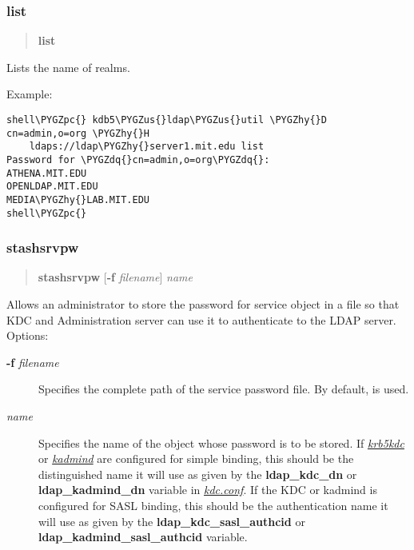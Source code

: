 \documentclass[letterpaper,10pt,english]{sphinxmanual}
\def\PYGZus{\char`\_}
\def\PYGZpc{\char`\%}
\def\PYGZhy{\char`\-}
\def\PYGZdq{\char`\"}
\begin{document}
\subsubsection{list}
\label{admin/admin_commands/kdb5_ldap_util:kdb5-ldap-util-destroy-end}\label{admin/admin_commands/kdb5_ldap_util:list}\label{admin/admin_commands/kdb5_ldap_util:kdb5-ldap-util-list}\begin{quote}

\textbf{list}
\end{quote}

Lists the name of realms.

Example:

\begin{Verbatim}[commandchars=\\\{\}]
shell\PYGZpc{} kdb5\PYGZus{}ldap\PYGZus{}util \PYGZhy{}D cn=admin,o=org \PYGZhy{}H
    ldaps://ldap\PYGZhy{}server1.mit.edu list
Password for \PYGZdq{}cn=admin,o=org\PYGZdq{}:
ATHENA.MIT.EDU
OPENLDAP.MIT.EDU
MEDIA\PYGZhy{}LAB.MIT.EDU
shell\PYGZpc{}
\end{Verbatim}


\subsubsection{stashsrvpw}
\label{admin/admin_commands/kdb5_ldap_util:kdb5-ldap-util-list-end}\label{admin/admin_commands/kdb5_ldap_util:stashsrvpw}\label{admin/admin_commands/kdb5_ldap_util:kdb5-ldap-util-stashsrvpw}\begin{quote}

\textbf{stashsrvpw}
{[}\textbf{-f} \emph{filename}{]}
\emph{name}
\end{quote}

Allows an administrator to store the password for service object in a
file so that KDC and Administration server can use it to authenticate
to the LDAP server.  Options:
\begin{description}
\item[{\textbf{-f} \emph{filename}}] \leavevmode
Specifies the complete path of the service password file. By
default,  is used.

\item[{\emph{name}}] \leavevmode
Specifies the name of the object whose password is to be stored.
If {\hyperref[admin/admin_commands/krb5kdc:krb5kdc-8]{\emph{krb5kdc}}} or {\hyperref[admin/admin_commands/kadmind:kadmind-8]{\emph{kadmind}}} are configured for
simple binding, this should be the distinguished name it will
use as given by the \textbf{ldap\_kdc\_dn} or \textbf{ldap\_kadmind\_dn}
variable in {\hyperref[admin/conf_files/kdc_conf:kdc-conf-5]{\emph{kdc.conf}}}.  If the KDC or kadmind is
configured for SASL binding, this should be the authentication
name it will use as given by the \textbf{ldap\_kdc\_sasl\_authcid} or
\textbf{ldap\_kadmind\_sasl\_authcid} variable.

\end{description}
\end{document}
